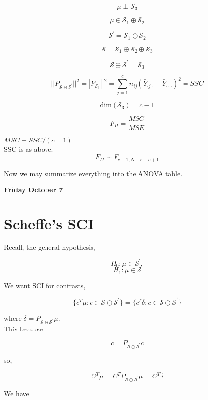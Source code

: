 \documentclass[11pt,fleqn]{book} %
\begin{document}
		$$\mu \perp \mathcal{S}_3$$

		$$\mu \in \mathcal{S}_1 \oplus \mathcal{S}_2 $$

		$$\mathcal{S}^\prime = \mathcal{S}_1 \oplus \mathcal{S}_2 $$

		$$\mathcal{S} = \mathcal{S}_1 \oplus \mathcal{S}_2 \oplus \mathcal{S}_3 $$

		$$\mathcal{S} \ominus \mathcal{S}^\prime = \mathcal{S}_3 $$



		$$||P_{\mathcal{S} \ominus \mathcal{S}^\prime} ||^2 = |P_{\mathcal{S}_3} ||^2 = \sum^{c}_{j = 1} n_{ij} (\bar{Y}_{ \cdot j \cdot} -  \bar{Y}_{\cdot \cdot \cdot} )^2 = SSC $$


		$$ \text{dim}(\mathcal{S}_3) = c - 1 $$

		$$F_{II} = \frac{MSC}{MSE} $$


$MSC = SSC / (c-1)$\\
SSC is as above. \\

		$$F_{II} \sim F_{c-1, N -r -c + 1} $$


		Now we may summarize everything into the ANOVA table. 



\textbf{Friday October 7}\\

\section{Scheffe's SCI}

Recall, the general hypothesis,

		$$H_0: \mu \in \mathcal{S}^\prime, $$
		$$H_1: \mu \in \mathcal{S}$$

We want SCI for contrasts,

		$$\{c^T \mu: c \in \mathcal{S} \ominus \mathcal{S}^\prime \} = \{c^T \delta: c \in \mathcal{S} \ominus \mathcal{S}^\prime \} $$


where $\delta = P_{\mathcal{S} \ominus \mathcal{S}^\prime} \mu$. \\

This because
		
		$$c = P_{\mathcal{S} \ominus \mathcal{S}^\prime} c $$

so, 

		$$C^T \mu = C^T  P_{\mathcal{S} \ominus \mathcal{S}^\prime} \mu = C^T \delta$$


We have
\end{document}
